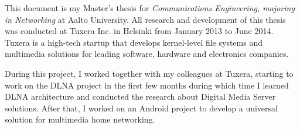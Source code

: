 
This document is my Master's thesis for \textit{Communications Engineering, majoring in
Networking} at Aalto University. All research and development of this thesis was
conducted at Tuxera Inc. in Helsinki from January 2013 to June 2014. Tuxera is a
high-tech startup that develops kernel-level file systems and multimedia solutions
for leading software, hardware and electronics companies.

During this project, I worked together with my colleagues at Tuxera, starting
to work on the DLNA project in the first few months during which time I learned
DLNA architecture and conducted the research about Digital Media Server solutions.
After that, I worked on an Android project to develop a universal solution for
multimedia home networking.